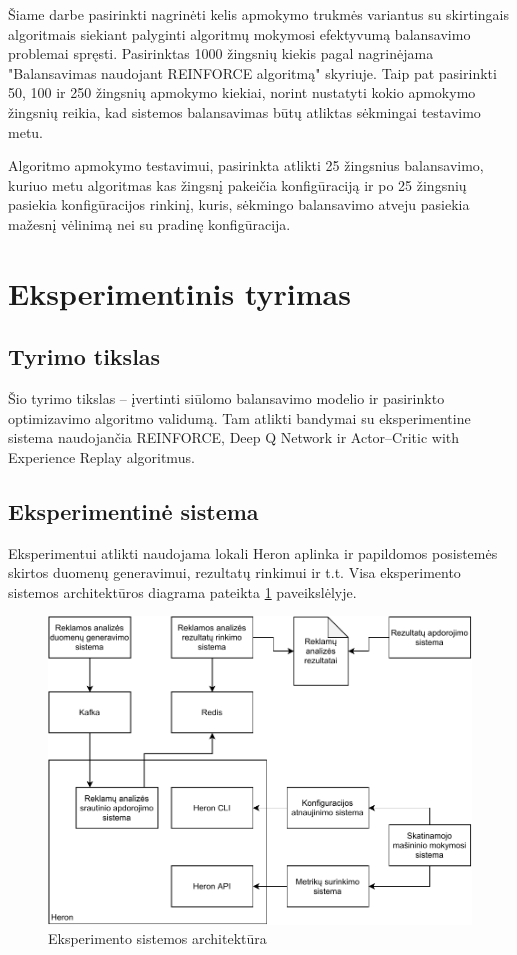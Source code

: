 \documentclass{VUMIFPSbakalaurinis}
\begin{document}
Šiame darbe pasirinkti nagrinėti kelis apmokymo trukmės variantus su skirtingais algoritmais siekiant palyginti algoritmų mokymosi efektyvumą balansavimo problemai spręsti. Pasirinktas 1000 žingsnių kiekis pagal \cite{vaquero2018autotuning} nagrinėjama "Balansavimas naudojant REINFORCE algoritmą" skyriuje. Taip pat pasirinkti 50, 100 ir 250 žingsnių apmokymo kiekiai, norint nustatyti kokio apmokymo žingsnių reikia, kad sistemos balansavimas būtų atliktas sėkmingai testavimo metu.

Algoritmo apmokymo testavimui, pasirinkta atlikti 25 žingsnius balansavimo, kuriuo metu algoritmas kas žingsnį pakeičia konfigūraciją ir po 25 žingsnių pasiekia konfigūracijos rinkinį, kuris, sėkmingo balansavimo atveju pasiekia mažesnį vėlinimą nei su pradinę konfigūracija.
\section{Eksperimentinis tyrimas}

\subsection{Tyrimo tikslas}

Šio tyrimo tikslas – įvertinti siūlomo balansavimo modelio ir pasirinkto optimizavimo algoritmo validumą. Tam atlikti bandymai su eksperimentine sistema naudojančia REINFORCE, Deep Q Network ir Actor–Critic with Experience Replay algoritmus.

\subsection{Eksperimentinė sistema}

Eksperimentui atlikti naudojama lokali Heron aplinka ir papildomos posistemės skirtos duomenų generavimui, rezultatų rinkimui ir t.t. Visa eksperimento sistemos architektūros diagrama pateikta \ref{experiment} paveikslėlyje.

\begin{figure}[H]
    \includegraphics[width=14cm]{img/Experiment.pdf}
    \caption{Eksperimento sistemos architektūra}
    \label{experiment}
\end{figure} 
\end{document}
